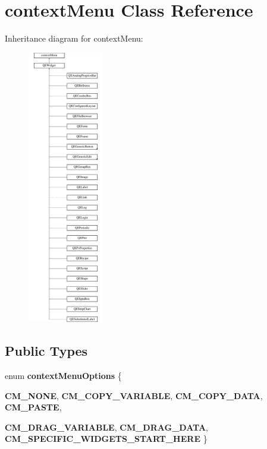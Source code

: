 \hypertarget{classcontextMenu}{
\section{contextMenu Class Reference}
\label{classcontextMenu}
}
Inheritance diagram for contextMenu:\begin{figure}[H]
\begin{center}
\leavevmode
\includegraphics[height=12.000000cm]{classcontextMenu}
\end{center}
\end{figure}
\subsection*{Public Types}
\begin{DoxyCompactItemize}
\item 
enum {\bfseries contextMenuOptions} \{ \par
{\bfseries CM\_\-NONE}, 
{\bfseries CM\_\-COPY\_\-VARIABLE}, 
{\bfseries CM\_\-COPY\_\-DATA}, 
{\bfseries CM\_\-PASTE}, 
\par
{\bfseries CM\_\-DRAG\_\-VARIABLE}, 
{\bfseries CM\_\-DRAG\_\-DATA}, 
{\bfseries CM\_\-SPECIFIC\_\-WIDGETS\_\-START\_\-HERE}
 \}
\end{DoxyCompactItemize}
